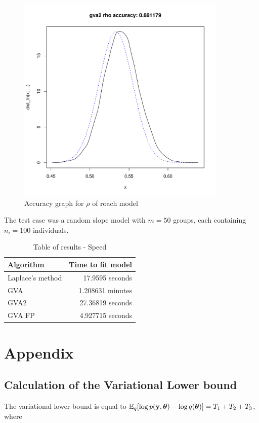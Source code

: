 \documentclass{article}[12pt]
\begin{document}
\begin{figure}
\caption{Accuracy graph for $\rho$ of roach model}
\label{fig:accuracy_roach_rho}
\includegraphics[width=100mm, height=100mm]{code/results/17_accuracy_plots_application_gva2.pdf}
\end{figure}

The test case was a random slope model with $m=50$ groups, each containing $n_i = 100$ individuals.

\begin{table}
\caption{Table of results - Speed}
\label{tab:application_slope_speed}
\begin{tabular}{|l|r|}
\hline
Algorithm & Time to fit model \\
\hline
Laplace's method & 17.9595 seconds \\
GVA & 1.208631 minutes \\
GVA2 & 27.36819 seconds \\
GVA FP & 4.927715 seconds \\
\hline
\end{tabular}
\end{table}


\newpage
\section{Appendix} 
\subsection{Calculation of the Variational Lower bound}
The variational lower bound is equal to
${\mathbb E}_q[\log{p({\bf y}, {\boldsymbol\theta})} - \log{q({\boldsymbol\theta})}] = T_1 + T_2 + T_3$,
where
\end{document}
